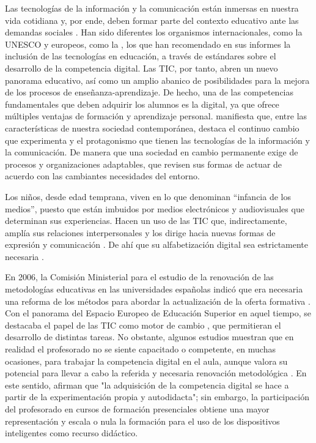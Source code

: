 \documentclass[spanish]{textolivre}
\begin{document}
Las tecnologías de la información y la comunicación están inmersas en nuestra vida cotidiana y, por ende, deben formar parte del contexto educativo ante las demandas sociales \cite{gutierrez_fresned_mejora_2016}. Han sido diferentes los organismos internacionales, como la UNESCO \cite{unesco2010} y europeos, como la \textcite{comisioneuropea2013}, los que han recomendado en sus informes la inclusión de las tecnologías en educación, a través de estándares sobre el desarrollo de la competencia digital. Las TIC, por tanto, abren un nuevo panorama educativo, así como un amplio abanico de posibilidades para la mejora de los procesos de enseñanza-aprendizaje. De hecho, una de las competencias fundamentales que deben adquirir los alumnos es la digital, ya que ofrece múltiples ventajas de formación y aprendizaje personal. \textcite{gairin_sallan_cambio_2009} manifiesta que, entre las características de nuestra sociedad contemporánea, destaca el continuo cambio que experimenta y el protagonismo que tienen las tecnologías de la información y la comunicación. De manera que una sociedad en cambio permanente exige de procesos y organizaciones adaptables, que revisen sus formas de actuar de acuerdo con las cambiantes necesidades del entorno.

Los niños, desde edad temprana, viven en lo que \textcite[p. 6]{sara_malo_2010} denominan “infancia de los medios”, puesto que están imbuidos por medios electrónicos y audiovisuales que determinan sus experiencias. Hacen un uso de las TIC que, indirectamente, amplía sus relaciones interpersonales y los dirige hacia nuevas formas de expresión y comunicación \cite{ortega-ruiz_towards_2014}. De ahí que su alfabetización digital sea estrictamente necesaria \cite{berzosa_ramos_tic_2015}. 

En 2006, la Comisión Ministerial para el estudio de la renovación de las metodologías educativas en las universidades españolas indicó que era necesaria una reforma de los métodos para abordar la actualización de la oferta formativa \cite{ministerio_de_educación_ciencia_2006}. Con el panorama del Espacio Europeo de Educación Superior en aquel tiempo, se destacaba el papel de las TIC como motor de cambio \cite{carrasco_pradas_tic_2005}, que permitieran el desarrollo de distintas tareas. No obstante, algunos estudios \cite{carrera_farran_identificacion_2012} muestran que en realidad el profesorado no se siente capacitado o competente, en muchas ocasiones, para trabajar la competencia digital en el aula, aunque valora su potencial para llevar a cabo la referida y necesaria renovación metodológica \cite{prendes_espinosa_competencias_2013}. En este sentido, \textcite[p. 1489]{agreda_montoro_formacion_2016} afirman que "la adquisición de la competencia digital se hace a partir de la experimentación propia y autodidacta"; sin embargo, la participación del profesorado en cursos de formación presenciales obtiene una mayor representación y escala o nula la formación para el uso de los dispositivos inteligentes como recurso didáctico. 
\end{document}
